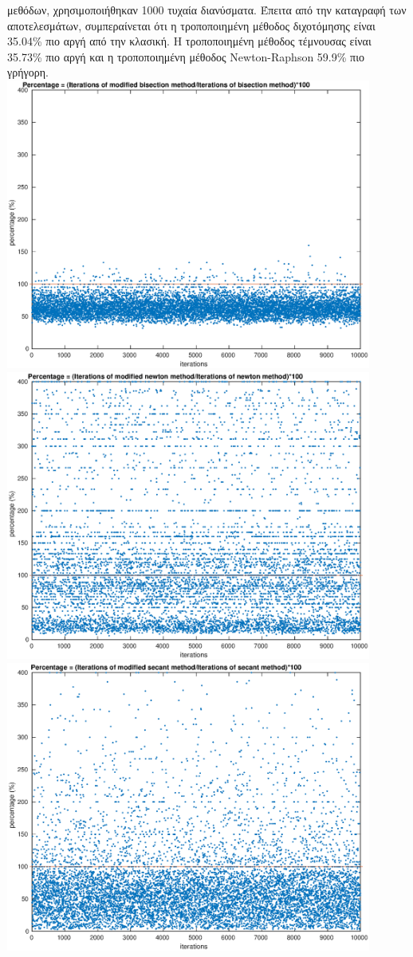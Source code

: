\documentclass[a4paper,11pt]{article}
\begin{document}
μεθόδων, χρησιμοποιήθηκαν 1000 τυχαία διανύσματα. Έπειτα από την καταγραφή 
των αποτελεσμάτων, συμπεραίνεται ότι η τροποποιημένη μέθοδος διχοτόμησης 
είναι 35.04\% πιο αργή από την 
κλασική. Η τροποποιημένη μέθοδος τέμνουσας είναι 35.73\% πιο αργή και η 
τροποποιημένη μέθοδος Newton-Raphson 59.9\% πιο γρήγορη. \\
\includegraphics[width=12cm]{stat1.eps}\\
\includegraphics[width=12cm]{stat2.eps}\\
\includegraphics[width=12cm]{stat3.eps}\\
\end{document}
